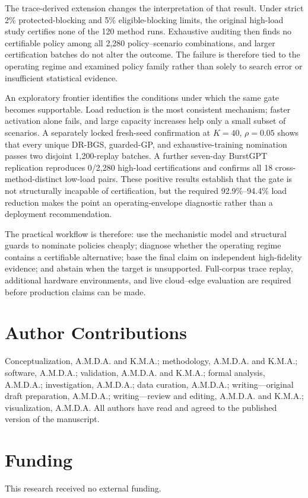 \documentclass[preprint,12pt]{elsarticle}
\begin{document}
The trace-derived extension changes the interpretation of that result. Under strict 2\% protected-blocking and 5\% eligible-blocking limits, the original high-load study certifies none of the 120 method runs. Exhaustive auditing then finds no certifiable policy among all 2,280 policy--scenario combinations, and larger certification batches do not alter the outcome. The failure is therefore tied to the operating regime and examined policy family rather than solely to search error or insufficient statistical evidence.

An exploratory frontier identifies the conditions under which the same gate becomes supportable. Load reduction is the most consistent mechanism; faster activation alone fails, and large capacity increases help only a small subset of scenarios. A separately locked fresh-seed confirmation at $K=40$, $\rho=0.05$ shows that every unique DR-BGS, guarded-GP, and exhaustive-training nomination passes two disjoint 1,200-replay batches. A further seven-day BurstGPT replication reproduces 0/2,280 high-load certifications and confirms all 18 cross-method-distinct low-load pairs. These positive results establish that the gate is not structurally incapable of certification, but the required 92.9\%--94.4\% load reduction makes the point an operating-envelope diagnostic rather than a deployment recommendation.

The practical workflow is therefore: use the mechanistic model and structural guards to nominate policies cheaply; diagnose whether the operating regime contains a certifiable alternative; base the final claim on independent high-fidelity evidence; and abstain when the target is unsupported. Full-corpus trace replay, additional hardware environments, and live cloud--edge evaluation are required before production claims can be made.
\section*{Author Contributions}
Conceptualization, A.M.D.A. and K.M.A.; methodology, A.M.D.A. and K.M.A.; software, A.M.D.A.; validation, A.M.D.A. and K.M.A.; formal analysis, A.M.D.A.; investigation, A.M.D.A.; data curation, A.M.D.A.; writing---original draft preparation, A.M.D.A.; writing---review and editing, A.M.D.A. and K.M.A.; visualization, A.M.D.A. All authors have read and agreed to the published version of the manuscript.

\section*{Funding}
This research received no external funding.
\end{document}
